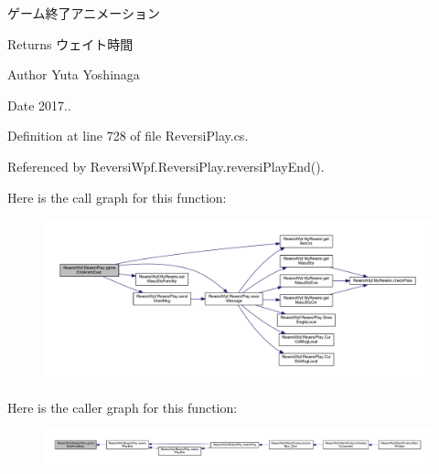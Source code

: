 ゲーム終了アニメーション 

\begin{DoxyReturn}{Returns}
ウェイト時間 
\end{DoxyReturn}
\begin{DoxyAuthor}{Author}
Yuta Yoshinaga 
\end{DoxyAuthor}
\begin{DoxyDate}{Date}
2017.. 
\end{DoxyDate}


Definition at line 728 of file Reversi\+Play.\+cs.



Referenced by Reversi\+Wpf.\+Reversi\+Play.\+reversi\+Play\+End().

Here is the call graph for this function\+:
\nopagebreak
\begin{figure}[H]
\begin{center}
\leavevmode
\includegraphics[width=350pt]{class_reversi_wpf_1_1_reversi_play_a222edc5a1161d4859635ef87d46da59c_cgraph}
\end{center}
\end{figure}
Here is the caller graph for this function\+:
\nopagebreak
\begin{figure}[H]
\begin{center}
\leavevmode
\includegraphics[width=350pt]{class_reversi_wpf_1_1_reversi_play_a222edc5a1161d4859635ef87d46da59c_icgraph}
\end{center}
\end{figure}
\mbox{\label{class_reversi_wpf_1_1_reversi_play_aee0447f5d955d0b2b66d14b491d90e81}} 
